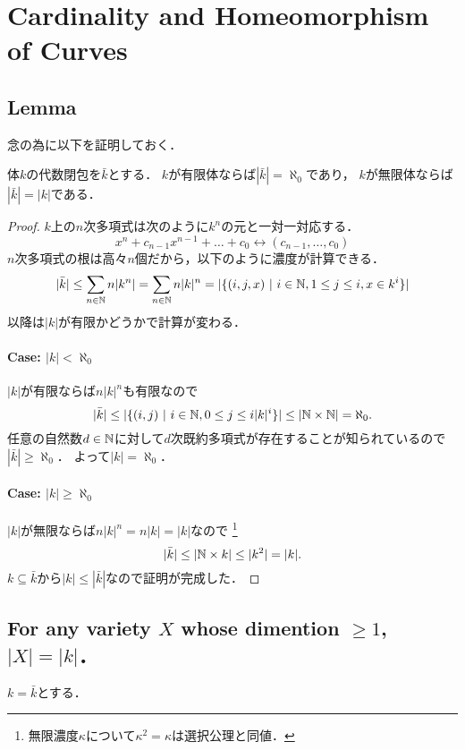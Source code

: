\documentclass[a4paper]{jsarticle}
\begin{document}
\section{Cardinality and Homeomorphism of Curves} %
    \subsection*{Lemma}
    念の為に以下を証明しておく．
    \begin{Lemma}
        体$k$の代数閉包を$\bar{k}$とする．
        $k$が有限体ならば$|\bar{k}|=\aleph_0$であり，
        $k$が無限体ならば$|\bar{k}|=|k|$である．
    \end{Lemma}
    \begin{proof}
        $k$上の$n$次多項式は次のように$k^n$の元と一対一対応する．
        \[ x^n+c_{n-1} x^{n-1}+\dots+c_0 \leftrightarrow (c_{n-1}, \dots, c_0) \]
        $n$次多項式の根は高々$n$個だから，以下のように濃度が計算できる．
        \[
            |\bar{k}|
            \leq \sum_{n \in \mathbb{N}}{n |k^n|}
            =\sum_{n \in \mathbb{N}}{n |k|^n}
            =|\{(i,j,x) ~|~ i \in \mathbb{N}, 1 \leq j \leq i, x \in k^i \}|
        \]
        以降は$|k|$が有限かどうかで計算が変わる．
        \paragraph{Case: $|k| < \aleph_0$}
            $|k|$が有限ならば$n |k|^n$も有限なので
            \[ |\bar{k}| \leq |\{(i,j) ~|~ i \in \mathbb{N}, 0 \leq j \leq i |k|^i \}| \leq |\mathbb{N} \times \mathbb{N}|=\aleph_0. \]
            任意の自然数$d \in \mathbb{N}$に対して$d$次既約多項式が存在することが知られているので$|\bar{k}| \geq \aleph_0$．
            よって$|k|=\aleph_0$．

        \paragraph{Case: $|k| \geq \aleph_0$}
            $|k|$が無限ならば$n|k|^n=n|k|=|k|$なので
            \footnote{無限濃度$\kappa$について$\kappa^2=\kappa$は選択公理と同値．}
            \[ |\bar{k}| \leq |\mathbb{N} \times k| \leq |k^2|=|k|. \]
            $k \subseteq \bar{k}$から$|k| \leq |\bar{k}|$なので証明が完成した．
    \end{proof}
    \subsection{For any variety $X$ whose dimention $\geq 1$, $|X|=|k|$．}
    $k=\bar{k}$とする．
\end{document}
